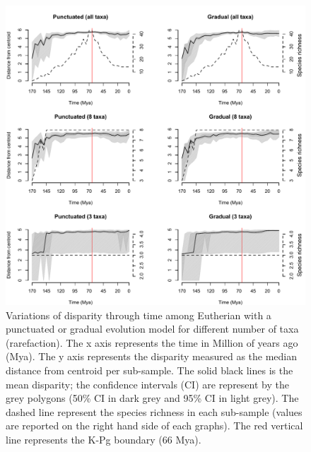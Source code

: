 \documentclass[12pt,letterpaper]{article}
\begin{document}
\begin{figure}[!htbp]
\centering
    \includegraphics[keepaspectratio=true]{Figures/Rarefaction(beck).pdf}
\caption{Variations of disparity through time among Eutherian with a punctuated or gradual evolution model for different number of taxa (rarefaction). The x axis represents the time in Million of years ago (Mya). The y axis represents the disparity measured as the median distance from centroid per sub-sample. The solid black lines is the mean disparity; the confidence intervals (CI) are represent by the grey polygons (50\% CI in dark grey and 95\% CI in light grey). The dashed line represent the species richness in each sub-sample (values are reported on the right hand side of each graphs). The red vertical line represents the K-Pg boundary (66 Mya).}
\end{figure}
\end{document}
